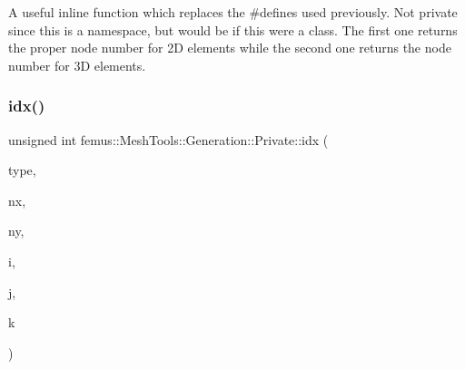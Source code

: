 A useful inline function which replaces the \#defines used previously. Not private since this is a namespace, but would be if this were a class. The first one returns the proper node number for 2D elements while the second one returns the node number for 3D elements. \mbox{\label{namespacefemus_1_1_mesh_tools_1_1_generation_1_1_private_a427a9bc92a94349eb97bb891a9434ee8}} 
\subsubsection{\texorpdfstring{idx()}{idx()}\hspace{0.1cm}{\footnotesize\ttfamily [2/2]}}
{\footnotesize\ttfamily unsigned int femus\+::\+Mesh\+Tools\+::\+Generation\+::\+Private\+::idx (\begin{DoxyParamCaption}\item[{const \mbox{\hyperlink{_elem_type_enum_8hpp_a1b014294b9757a001707c979e2bab627}{Elem\+Type}}}]{type,  }\item[{const unsigned int}]{nx,  }\item[{const unsigned int}]{ny,  }\item[{const unsigned int}]{i,  }\item[{const unsigned int}]{j,  }\item[{const unsigned int}]{k }\end{DoxyParamCaption})\hspace{0.3cm}{\ttfamily [inline]}}

